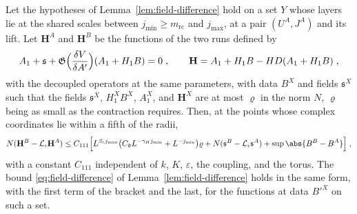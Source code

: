 \begin{lemma}\label{lem:field-difference-111}
Let the hypotheses of Lemma~\ref{lem:field-difference} hold on a set $Y$ whose layers lie at the shared scales between $j_{\min} \geq m_{\mathrm{rc}}$ and $j_{\max}$, at a pair $(U^A, J^A)$ and its lift. Let $\mathbf H^A$ and $\mathbf H^B$ be the functions of the two runs defined by
\[
    A_1 + \mathfrak s + \mathfrak G\Bigl(\frac{\delta V}{\delta A'}\Bigr)(A_1 + H_1B) = 0\;,
    \qquad
    \mathbf H = A_1 + H_1B - HD(A_1 + H_1B)\;,
\]
with the decoupled operators at the same parameters, with data $B^X$ and fields $\mathfrak s^X$ such that the fields $\mathfrak s^X$, $H^X_1B^X$, $A^X_1$, and $\mathbf H^X$ are at most $\varrho$ in the norm $N$, $\varrho$ being as small as the contraction \cite[(116)--(121)]{BalabanVAR} requires. Then, at the points whose complex coordinates lie within a fifth of the radii,
\begin{equation}\label{eq:field-difference-111}
    N(\mathbf H^B - \mathcal L_\iota\mathbf H^A) \leq C_{111}\Bigl[L^{\beta_cj_{\max}}\bigl(C_{\mathfrak d}L^{-\gamma_Hj_{\min}} + L^{-j_{\min}}\bigr)\varrho + N(\mathfrak s^B - \mathcal L_\iota\mathfrak s^A) + \sup\abs{B^B - B^A}\Bigr]\;,
\end{equation}
with a constant $C_{111}$ independent of $k$, $K$, $\varepsilon$, the coupling, and the torus. The bound \eqref{eq:field-difference} of Lemma~\ref{lem:field-difference} holds in the same form, with the first term of the bracket and the last, for the functions \cite[(179), (180)]{BalabanVAR} at data $B'^X$ on such a set.
\end{lemma}


